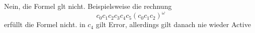 Nein, die Formel glt nicht.
Beispielsweise die rechnung
\[c_0c_1c_2c_3c_4c_5(c_0c_1c_2)^\omega\]
erfüllt die Formel nicht. in $c_4$ gilt Error, allerdings gilt danach nie wieder Active